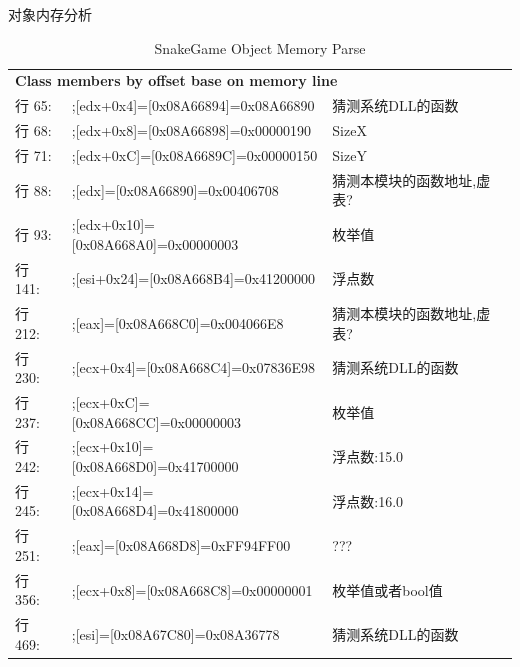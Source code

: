 \documentclass[AutoFakeBold,AutoFakeSlant]{beamer}
\begin{document}
\begin{frame}[fragile]{对象内存分析}
    \tiny
    \begin{table}[htbp] %
        \centering %
        \caption{SnakeGame Object Memory Parse}
        \begin{tabular}{p{1cm}p{5cm}p{4cm}}
            \toprule
            \multicolumn{3}{l}{\textbf{Class members by offset base on memory line}} \\
            行  65: & ;[edx+0x4]=[0x08A66894]=0x08A66890  & 猜测系统DLL的函数                \\[0.6ex]
            行  68: & ;[edx+0x8]=[0x08A66898]=0x00000190  & SizeX                     \\[0.6ex]
            行  71: & ;[edx+0xC]=[0x08A6689C]=0x00000150  & SizeY                     \\[0.6ex]
            行  88: & ;[edx]=[0x08A66890]=0x00406708      & 猜测本模块的函数地址,虚表?            \\[0.6ex]
            行  93: & ;[edx+0x10]=[0x08A668A0]=0x00000003 & 枚举值                       \\[0.6ex]
            行 141: & ;[esi+0x24]=[0x08A668B4]=0x41200000 & 浮点数                       \\[0.6ex]
            行 212: & ;[eax]=[0x08A668C0]=0x004066E8      & 猜测本模块的函数地址,虚表?            \\[0.6ex]
            行 230: & ;[ecx+0x4]=[0x08A668C4]=0x07836E98  & 猜测系统DLL的函数                \\[0.6ex]
            行 237: & ;[ecx+0xC]=[0x08A668CC]=0x00000003  & 枚举值                       \\[0.6ex]
            行 242: & ;[ecx+0x10]=[0x08A668D0]=0x41700000 & 浮点数:15.0                  \\[0.6ex]
            行 245: & ;[ecx+0x14]=[0x08A668D4]=0x41800000 & 浮点数:16.0                  \\[0.6ex]
            行 251: & ;[eax]=[0x08A668D8]=0xFF94FF00      & ???                       \\[0.6ex]
            行 356: & ;[ecx+0x8]=[0x08A668C8]=0x00000001  & 枚举值或者bool值                \\[0.6ex]
            行 469: & ;[esi]=[0x08A67C80]=0x08A36778      & 猜测系统DLL的函数                \\[0.6ex]
        \end{tabular}
    \end{table}
\end{frame}
\end{document}
